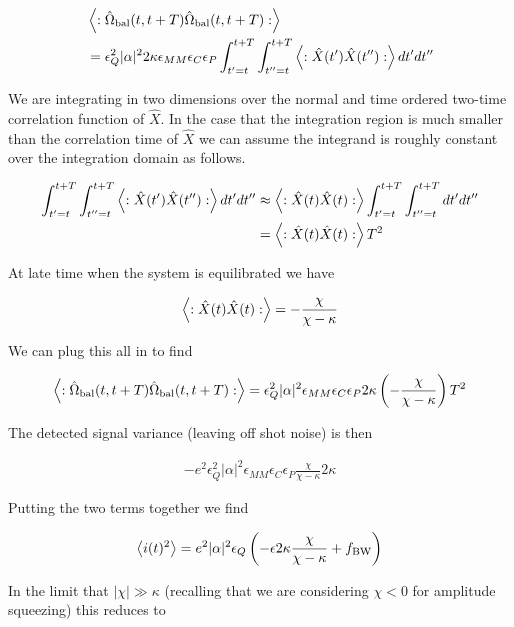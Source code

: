 \documentclass[12pt]{article}
\begin{document}
\begin{align}
&\Braket{:\hat{\Omega}_{\text{bal}}(t,t+T) \hat{\Omega}_{\text{bal}}(t,t+T):}\\
&= \epsilon_Q^2|\alpha|^2 2\kappa \epsilon_{MM} \epsilon_C \epsilon_P \int_{t'=t}^{t+T}\int_{t''=t}^{t+T} \Braket{:\hat{X}(t')\hat{X}(t'') :}dt' dt''
\end{align}

We are integrating in two dimensions over the normal and time ordered two-time correlation function of $\hat{X}$. In the case that the integration region is much smaller than the correlation time of $\hat{X}$ we can assume the integrand is roughly constant over the integration domain as follows.

\begin{align}
\int_{t'=t}^{t+T}\int_{t''=t}^{t+T} \Braket{:\hat{X}(t')\hat{X}(t'') :}dt' dt'' &\approx \Braket{:\hat{X}(t)\hat{X}(t):}
\int_{t'=t}^{t+T}\int_{t''=t}^{t+T} dt' dt''\\
&=\Braket{:\hat{X}(t)\hat{X}(t):}T^2
\end{align}

At late time when the system is equilibrated we have

\begin{align}
\Braket{:\hat{X}(t)\hat{X}(t):} = -\frac{\chi}{\chi-\kappa}
\end{align}

We can plug this all in to find

\begin{align}
\Braket{:\hat{\Omega}_{\text{bal}}(t,t+T) \hat{\Omega}_{\text{bal}}(t,t+T):} = \epsilon_Q^2 |\alpha|^2 \epsilon_{MM}\epsilon_C \epsilon_P 2\kappa \left(-\frac{\chi}{\chi-\kappa}\right) T^2
\end{align}

The detected signal variance (leaving off shot noise) is then

\begin{align}
-e^2 \epsilon_Q^2 |\alpha|^2 \epsilon_{MM}\epsilon_C \epsilon_P \frac{\chi}{\chi-\kappa} 2\kappa
\end{align}

Putting the two terms together we find

\begin{align}
\Braket{i(t)^2} = e^2 |\alpha|^2 \epsilon_Q\left(-\epsilon2\kappa \frac{\chi}{\chi-\kappa} + f_{\text{BW}} \right)
\end{align}

In the limit that $|\chi| \gg \kappa$ (recalling that we are considering $\chi<0$ for amplitude squeezing) this reduces to
\end{document}
